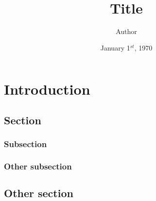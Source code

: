 \documentclass[a4paper]{report}
\title{Title}
\author{Author}
\date{January 1$^{st}$, 1970}
\begin{document}
    \maketitle
    \cleardoublepage

    \tableofcontents
    
    \chapter{Introduction}
        \blindmathtrue
        \blindtext
        \section{Section}
            \begin{theorem}
                \blindtext
            \end{theorem}
            
            \begin{corollary}
                \blindtext
            \end{corollary}
            
            \begin{definition}
                \blindtext
            \end{definition}
            
            \begin{remark}
                \blindtext
            \end{remark}
            
            \begin{lemma}
                \blindtext
            \end{lemma}
            
            \begin{proposition}
                \blindtext
            \end{proposition}
            \subsection{Subsection}
            \subsection{Other subsection}
        \section{Other section}
            \blinditemize
            \blindenumerate
            \blinddescription
\end{document}
